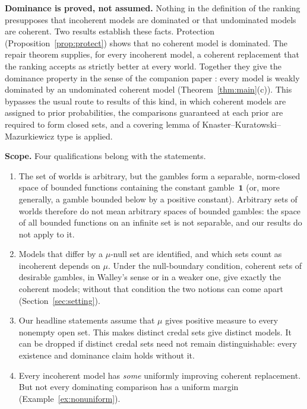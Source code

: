 \documentclass[11pt]{article}
\newcommand{\one}{\mathbf{1}}
\theoremstyle{plain}
\theoremstyle{definition}
\theoremstyle{remark}
\begin{document}
\smallskip\noindent\textbf{Dominance is proved, not assumed.} Nothing in the definition of the
ranking presupposes that incoherent models are dominated or that undominated models are
coherent. Two results establish these facts. Protection (Proposition~\ref{prop:protect}) shows
that no coherent model is dominated. The repair theorem supplies, for every incoherent model, a
coherent replacement that the ranking accepts as strictly better at every world. Together they
give the dominance property in the sense of the companion paper \cite{KCMcompanion}: every model
is weakly dominated by an undominated coherent model (Theorem~\ref{thm:main}(c)). This bypasses the usual route to results
of this kind, in which coherent models are assigned to prior probabilities, the comparisons
guaranteed at each prior are required to form closed sets, and a covering lemma of
Knaster--Kuratowski--Mazurkiewicz type is applied.

\smallskip\noindent\textbf{Scope.} Four qualifications belong with the statements.
\begin{enumerate}[label=(\arabic*)]
  \item The set of worlds is arbitrary, but the gambles form a separable, norm-closed space
  of bounded functions containing the constant gamble~$\one$ (or, more generally, a gamble
  bounded below by a positive constant). Arbitrary sets of worlds therefore do not mean
  arbitrary spaces of bounded gambles: the space of all bounded functions on an infinite set
  is not separable, and our results do not apply to it.
  \item Models that differ by a $\mu$-null set are identified, and which sets count as
  incoherent depends on $\mu$. Under the null-boundary condition, coherent sets of desirable
  gambles, in Walley's sense or in a weaker one, give exactly the coherent models; without
  that condition the two notions can come apart (Section~\ref{sec:setting}).
  \item Our headline statements assume that $\mu$ gives positive measure to every nonempty
  open set. This makes distinct credal sets give distinct models. It can be dropped if
  distinct credal sets need not remain distinguishable: every existence and dominance claim
  holds without it.
  \item Every incoherent model has \emph{some} uniformly improving coherent replacement. But
  not every dominating comparison has a uniform margin (Example~\ref{ex:nonuniform}).
\end{enumerate}
\end{document}
